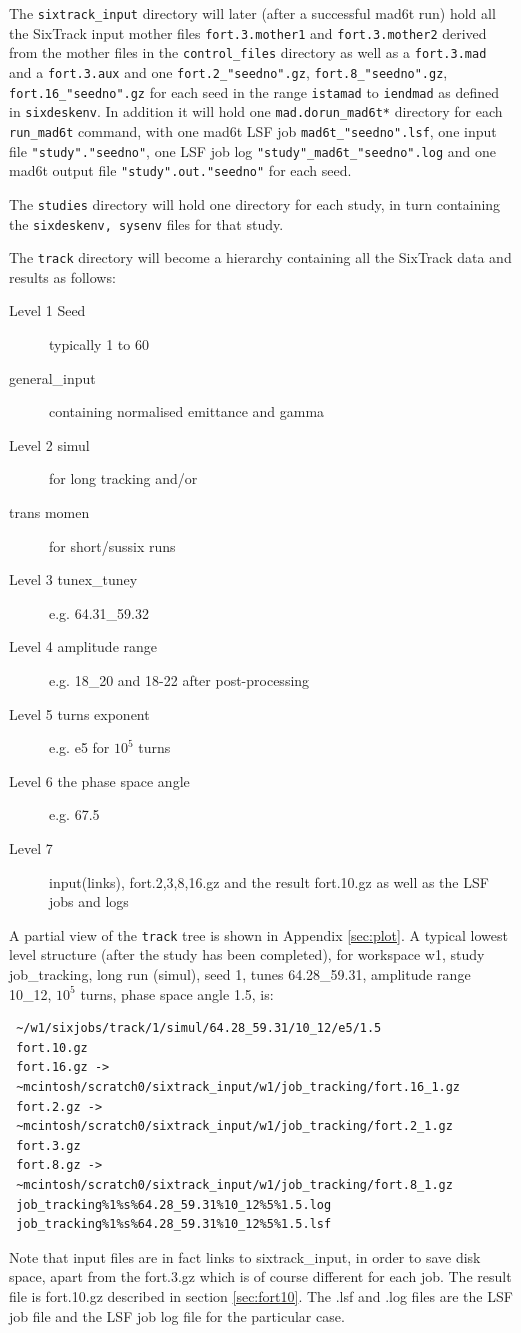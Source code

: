 \documentclass{article}    %
\begin{document}
The {\tt sixtrack\_input} directory will later (after a successful mad6t run)
hold all the SixTrack input 
mother files {\tt fort.3.mother1} and {\tt fort.3.mother2} derived from the mother files
in the {\tt control\_files} directory as well as a {\tt fort.3.mad} and a {\tt fort.3.aux}
and one {\tt fort.2\_"seedno".gz}, {\tt fort.8\_"seedno".gz}, 
{\tt fort.16\_"seedno".gz}
for each seed in the range {\tt istamad} to {\tt iendmad} as defined in
{\tt sixdeskenv}. In addition it will
hold one {\tt mad.dorun\_mad6t*} directory for each {\tt run\_mad6t} command,
with one mad6t LSF job {\tt mad6t\_"seedno".lsf}, one input file {\tt "study"."seedno"}, 
one LSF job log 
{\tt "study"\_mad6t\_"seedno".log} 
and one mad6t output file 
{\tt "study".out."seedno"} for each seed. 

The {\tt studies} directory will hold one directory for each study, in turn
containing the {\tt sixdeskenv, sysenv} files for that study.

The {\tt track} directory will become a hierarchy containing all the SixTrack data
and results as follows:
\begin{description}
\item [Level 1 Seed] typically 1 to 60
\item[         general\_input] containing normalised emittance and gamma
\item [Level 2 simul] for long tracking and/or 
\item [        trans momen] for short/sussix runs
\item [Level 3 tunex\_tuney] e.g. 64.31\_59.32
\item [Level 4 amplitude range] e.g. 18\_20 and 18-22 after post-processing
\item [Level 5 turns exponent] e.g. e5 for $10^5$ turns
\item [Level 6 the phase space angle] e.g. 67.5  
\item [Level 7] input(links), fort.2,3,8,16.gz and the result fort.10.gz 
as well as the LSF jobs and logs
\end{description}
A partial view of the {\tt track} tree is shown in Appendix \ref{sec:plot}.
A typical lowest level structure (after the study has been completed),
for workspace w1, study job\_tracking, long run (simul), seed 1,
tunes 64.28\_59.31, amplitude range 10\_12, $10^5$ turns, phase space angle 1.5, is:
\begin{verbatim}
 ~/w1/sixjobs/track/1/simul/64.28_59.31/10_12/e5/1.5
 fort.10.gz
 fort.16.gz -> 
 ~mcintosh/scratch0/sixtrack_input/w1/job_tracking/fort.16_1.gz
 fort.2.gz -> 
 ~mcintosh/scratch0/sixtrack_input/w1/job_tracking/fort.2_1.gz
 fort.3.gz
 fort.8.gz -> 
 ~mcintosh/scratch0/sixtrack_input/w1/job_tracking/fort.8_1.gz
 job_tracking%1%s%64.28_59.31%10_12%5%1.5.log
 job_tracking%1%s%64.28_59.31%10_12%5%1.5.lsf
\end{verbatim}
Note that input files are in fact links to sixtrack\_input, in order to save disk space,
apart from the fort.3.gz which is of course different for each job. The result
file is fort.10.gz described in section \ref{sec:fort10}. The .lsf and .log
files are the LSF job file and the LSF job log file for the particular case. 
\end{document}
